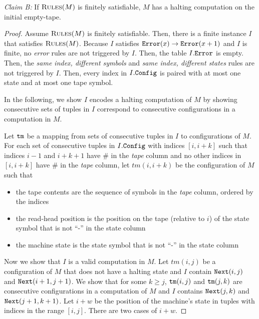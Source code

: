 {\sl Claim B:}
If $\textsc{Rules}(M)$ is finitely satisfiable,
$M$ has a halting computation on the initial empty-tape.

\begin{proof}
Assume $\textsc{Rules}(M)$ is finitely satisfiable.
Then, there is a finite instance $I$ that satisfies $\textsc{Rules}(M)$.
Because $I$ satisfies $\texttt{\tt Error}(x) \rightarrow \texttt{\tt Error}(x+1)$
and $I$ is finite,
no {\em error} rules are not triggered by $I$.
Then,
the table $I.\texttt{\tt Error}$ is empty.
Then,
the {\it same index, different symbols}
and {\it same index, different states}
rules are not triggered by $I$.
Then,
every index in $I.\texttt{Config}$ is paired with
at most one state and at most one tape symbol.

In the following,
we show $I$ encodes
a halting computation of $M$
by showing consecutive sets of tuples in $I$
correspond to consecutive configurations
in a computation in $M$.

Let $\texttt{tm}$ be a mapping from sets of consecutive tuples in $I$
to configurations of $M$.
For each set of consecutive tuples in $I.\texttt{Config}$
with indices $[i,i+k]$ such that indices $i{-}1$ and $i+k+1$ have $\#$ in the {\em tape} column
and
no other indices in $[i,i+k]$ have $\#$
in the {\em tape} column,
let $tm(i, i+k)$ be the configuration of $M$ such that
\begin{itemize}
\item the tape contents are the sequence of symbols in the {\em tape} column,
ordered by the indices
\item the read-head position is the position on the tape
(relative to $i$)
of the state symbol
that is not ``-'' in the state column
\item the machine state is the state symbol that is not ``-'' in the state column
\end{itemize}

Now we show that $I$ is a valid computation in $M$.
Let $tm(i, j)$ be a configuration of $M$
that does not have a halting state
and $I$ contain $\texttt{Next}(i, j)$ and $\texttt{Next}(i+1, j+1)$.
We show that for some $k\ge j$, $\texttt{tm}(i, j)$ and $\texttt{tm}(j, k)$ are consecutive configurations
in a computation of $M$ and
$I$ contains $\texttt{Next}(j, k)$ and $\texttt{Next}(j+1, k+1)$.
Let $i+w$ be the position of the machine's state in tuples with indices in the range $[i, j]$.
There are two cases of $i+w$.


\end{proof}
